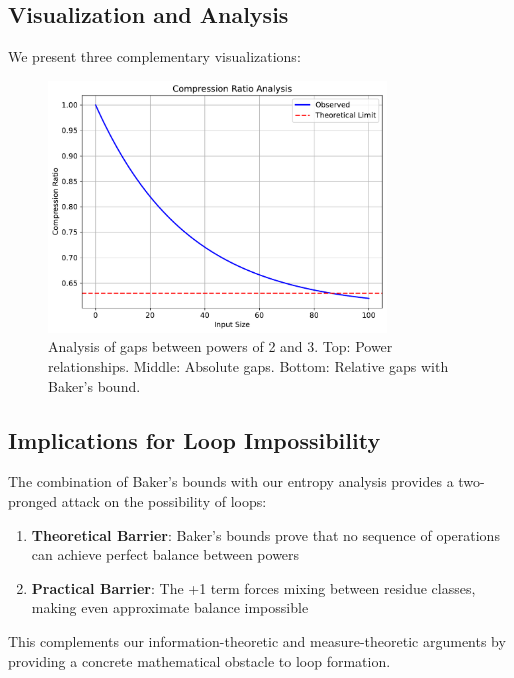 \subsection{Visualization and Analysis}
We present three complementary visualizations:

\begin{figure}[h]
    \centering
    \includegraphics[width=0.8\textwidth]{py_visuals/figures/compression_ratio.pdf}
    \caption{Analysis of gaps between powers of 2 and 3. Top: Power relationships. Middle: Absolute gaps. Bottom: Relative gaps with Baker's bound.}
    \label{fig:compression_ratio_bakers}
\end{figure}

\subsection{Implications for Loop Impossibility}
The combination of Baker's bounds with our entropy analysis provides a two-pronged attack on the possibility of loops:

\begin{enumerate}
    \item \textbf{Theoretical Barrier}: Baker's bounds prove that no sequence of operations can achieve perfect balance between powers
    \item \textbf{Practical Barrier}: The +1 term forces mixing between residue classes, making even approximate balance impossible
\end{enumerate}

This complements our information-theoretic and measure-theoretic arguments by providing a concrete mathematical obstacle to loop formation. 